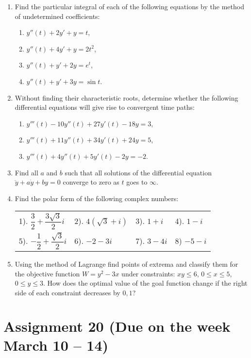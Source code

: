 \documentclass[12pt]{article} %
\theoremstyle{definition} %
\begin{document}
\begin{enumerate}
\item Find the particular integral of each of the following equations by the method of undetermined coefficients:

\begin{enumerate}
\item $y''(t)+2y'+y=t$,
\item $y''(t)+4y'+y=2t^2$,
\item $y''(t)+y'+2y=e^t$,
\item $y''(t)+y'+3y=\sin t$.
\end{enumerate}

\item Without finding their characteristic roots, determine whether the following differential equations will give rise to convergent time paths:
\begin{enumerate}
\item $y'''(t)-10y''(t)+27 y'(t)-18y=3$,
\item $y'''(t)+11y''(t)+34 y'(t)+24 y=5$,
\item $y'''(t)+4y''(t)+5y'(t)-2y=-2$.
\end{enumerate}

\item Find all $a$ and $b$ such that all solutions of the differential equation $\ddot{y}+a\dot{y}+by=0$ converge to zero as $t$ goes to $\infty$.

\item Find the polar form of the following complex numbers:

\begin{tabular}{llll}
1). $\dfrac32+\dfrac{3\sqrt{3}}2i$ & 2). $4(\sqrt{3}+i)$ & 3). $1+i$ & 4). $1-i$\\
5). $-\dfrac12+\dfrac {\sqrt{3}}2i$ & 6). $-2-3i$ & 7). $3-4i$ & 8) $-5-i$\\
\end{tabular}

\item Using the method of Lagrange find points of extrema and classify them for the objective function $W=y^2-3x$ under constraints: $xy\leqslant 6$, $0\leqslant x\leqslant 5$, $0\leqslant y\leqslant 3$. How does the optimal value of the goal function change if the right side of each constraint decreases by $0,1$?
\end{enumerate}




\section{Assignment 20 (Due on the week March 10 – 14)}
\end{document}
